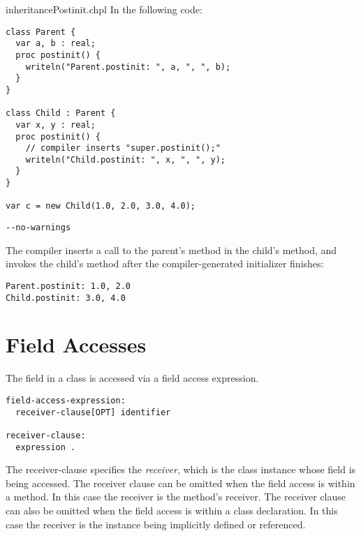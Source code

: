 \begin{chapelexample}{inheritancePostinit.chpl}
In the following code:
\begin{chapel}
\begin{verbatim}
class Parent {
  var a, b : real;
  proc postinit() {
    writeln("Parent.postinit: ", a, ", ", b);
  }
}

class Child : Parent {
  var x, y : real;
  proc postinit() {
    // compiler inserts "super.postinit();"
    writeln("Child.postinit: ", x, ", ", y);
  }
}

var c = new Child(1.0, 2.0, 3.0, 4.0);
\end{verbatim}
\end{chapel}
\begin{chapelcompopts}
\begin{verbatim}
--no-warnings
\end{verbatim}
\end{chapelcompopts}
The compiler inserts a call to the parent's  method in the
child's  method, and invokes the child's  method
after the compiler-generated initializer finishes:
\begin{chapelprintoutput}
\begin{verbatim}
Parent.postinit: 1.0, 2.0
Child.postinit: 3.0, 4.0
\end{verbatim}
\end{chapelprintoutput}
\end{chapelexample}

\section{Field Accesses}
\label{Class_Field_Accesses}

The field in a class is accessed via a field access expression.

\begin{syntax}
\begin{verbatim}
field-access-expression:
  receiver-clause[OPT] identifier

receiver-clause:
  expression .
\end{verbatim}
\end{syntax}

The receiver-clause specifies the \emph{receiver}, which is the class
instance whose field is being accessed.
The receiver clause can be omitted when the field access is within a method.
In this case the receiver is the method's receiver.
The receiver clause can also be omitted when the field access is within
a class declaration. In this case the receiver is the instance
being implicitly defined or referenced.

